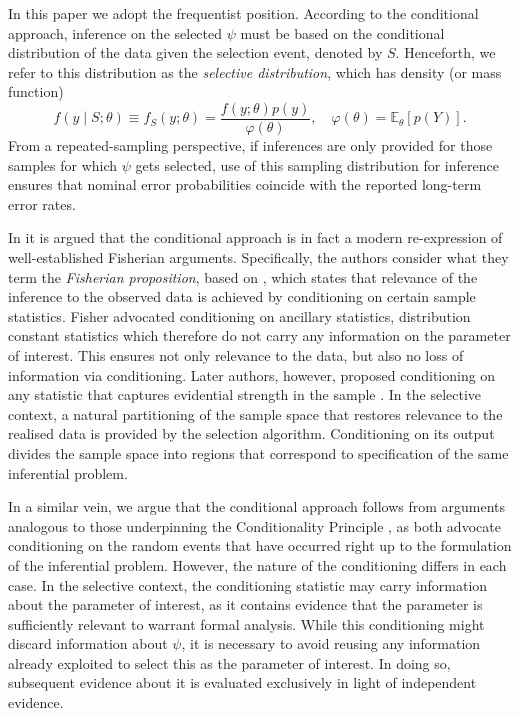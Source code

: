 \documentclass[pdflatex,sn-chicago]{sn-jnl}%
\theoremstyle{thmstyleone}%
\theoremstyle{thmstyletwo}%
\theoremstyle{thmstylethree}%
\begin{document}
In this paper we adopt the frequentist position. According to the conditional approach, inference on the selected $\psi$ must be based on the conditional distribution of the data given the selection event, denoted by $S$. Henceforth, we refer to this distribution as the \textit{selective distribution}, which has density (or mass function)  
\begin{equation*} 
f(y\mid S; \theta)\equiv f_S(y; \theta ) = \frac{f(y; \theta) p(y)}{\varphi(\theta)}, \quad \varphi(\theta) = \mathbb{E}_\theta[p(Y)].
\end{equation*}
From a repeated-sampling perspective, if inferences are only provided for those samples for which $\psi$ gets selected, use of this sampling distribution for inference ensures that nominal error probabilities coincide with the reported long-term error rates.

In \cite{kuffneryoung} it is argued that the conditional approach is in fact a modern re-expression of well-established Fisherian arguments.  Specifically, the authors consider what they term the \textit{Fisherian proposition}, based on \cite{fisher1, fisher2}, which states that relevance of the inference to the observed data is achieved by conditioning on certain sample statistics. Fisher advocated conditioning on ancillary statistics, distribution constant statistics which therefore do not carry any information on the parameter of interest. This ensures not only relevance to the data, but also no loss of information via conditioning. Later authors, however, proposed conditioning on any statistic that captures evidential strength in the sample \citep{kiefer1, kiefer2, brown, berger}. In the selective context, a natural partitioning of the sample space that restores relevance to the realised data is provided by the selection algorithm. Conditioning on its output divides the sample space into regions that correspond to specification of the same inferential problem.

In a similar vein, we argue that the conditional approach follows from arguments analogous to those underpinning the Conditionality Principle \citep{birnbaum}, as both advocate conditioning on the random events that have occurred right up to the formulation of the inferential problem. However, the nature of the conditioning differs in each case. In the selective context, the conditioning statistic may carry information about the parameter of interest, as it contains evidence that the parameter is sufficiently relevant to warrant formal analysis. While this conditioning might discard information about $\psi$, it is necessary to avoid reusing any information already exploited to select this as the parameter of interest. In doing so, subsequent evidence about it is evaluated exclusively in light of independent evidence.
\end{document}
